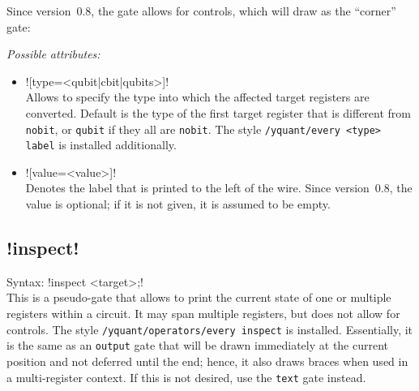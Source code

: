 \documentclass{scrartcl}
\def\ttlink{\link\texttt}
\begin{document}
         Since version~0.8, the gate allows for controls, which will draw as the ``corner'' gate:
         \begin{center}
            \begin{yquantgroup}
               \equals
            \end{yquantgroup}
         \end{center}

         \emph{Possible attributes:}
         \begin{itemize}
            \item \yquant![type=<qubit|cbit|qubits>]! \\
               Allows to specify the type into which the affected target registers are converted.
               Default is the type of the first target register that is different from \ttlink{nobit}, or \ttlink{qubit} if they all are \ttlink{nobit}.
               The style \texttt{/yquant/every <type> label} is installed additionally.
            \item {}\yquant![value=<value>]! \\
               Denotes the label that is printed to the left of the wire.
               Since version~0.8, the value is optional; if it is not given, it is assumed to be empty.
         \end{itemize}

      \subsection[\texorpdfstring{\yquant{inspect}}{inspect}]{\yquant!inspect!}
         Syntax: \yquant!inspect <target>;! \\
         This is a pseudo\hyp gate that allows to print the current state of one or multiple registers within a circuit.
         It may span multiple registers, but does not allow for controls.
         The style \ttlink{/yquant/operators/every inspect} is installed.
         Essentially, it is the same as an \ttlink{output} gate that will be drawn immediately at the current position and not deferred until the end; hence, it also draws braces when used in a multi\hyp register context.
         If this is not desired, use the \ttlink{text} gate instead.
\end{document}
